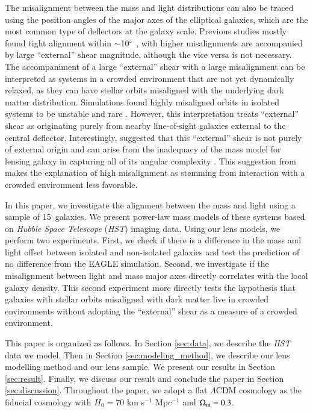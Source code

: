 \documentclass{aa}
\newcommand{\nlens}{15}
\begin{document}
The misalignment between the mass and light distributions can also be traced using the position angles of the major axes of the elliptical galaxies, which are the most common type of deflectors at the galaxy scale. Previous studies mostly found tight alignment within $\sim$10$^\circ$ \citep{Keeton98b, Kochanek02, Treu09, Gavazzi12, Sluse12, Bruderer16, Shajib19, Shajib21}, with higher misalignments are accompanied by large ``external'' shear magnitude, although the vice versa is not necessary. The accompaniment of a large ``external'' shear with a large misalignment can be interpreted as systems in a crowded environment that are not yet dynamically relaxed, as they can have stellar orbits misaligned with the underlying dark matter distribution. Simulations found highly misaligned orbits in isolated systems to be unstable and rare \citep{Heiligman79, Martinet88, Adams07, Debattista15}. However, this interpretation treats ``external'' shear as originating purely from nearby line-of-sight galaxies external to the central deflector. Interestingly, \citet{Etherington23} suggested that this ``external'' shear is not purely of external origin and can arise from the inadequacy of the mass model for lensing galaxy in capturing all of its angular complexity \citep[for example, boxy/discyness, ellipticity gradient, isophotal twists;][]{VandeVyvere22, VandeVyvere22b}. This suggestion from \citet{Etherington23} makes the explanation of high misalignment as stemming from interaction with a crowded environment less favorable.

In this paper, we investigate the alignment between the mass and light using a sample of \nlens\  galaxies. We present power-law mass models of these systems based on \textit{Hubble Space Telescope} (\textit{HST}) imaging data. Using our lens models, we perform two experiments. First, we check if there is a difference in the mass and light offset between isolated and non-isolated galaxies and test the prediction of no difference from the EAGLE simulation. Second, we investigate if the misalignment between light and mass major axes directly correlates with the local galaxy density. This second experiment more directly tests the hypothesis that galaxies with stellar orbits misaligned with dark matter live in crowded environments without adopting the ``external'' shear as a measure of a crowded environment.

This paper is organized as follows. In Section \ref{sec:data}, we describe the \textit{HST} data we model. Then in Section \ref{sec:modeling_method}, we describe our lens modelling method and our lens sample. We present our results in Section \ref{sec:result}. Finally, we discuss our result and conclude the paper in Section \ref{sec:discussion}. Throughout the paper, we adopt a flat $\Lambda$CDM cosmology as the fiducial cosmology with $H_0= 70$ km s$^{-1}$ Mpc$^{-1}$ and $\Omega_{\rm m} = 0.3$.
\end{document}

